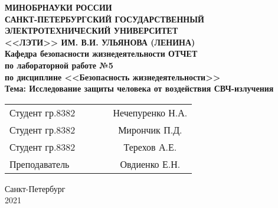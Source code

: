 \begin{titlepage}

\begin{center}
\textbf{
МИНОБРНАУКИ РОССИИ \\
САНКТ-ПЕТЕРБУРГСКИЙ ГОСУДАРСТВЕННЫЙ \\
ЭЛЕКТРОТЕХНИЧЕСКИЙ УНИВЕРСИТЕТ \\
<<ЛЭТИ>> ИМ. В.И. УЛЬЯНОВА (ЛЕНИНА) \\
Кафедра безопасности жизнедеятельности
\vfill
ОТЧЕТ\\
по лабораторной работе №5\\
по дисциплине <<Безопасность жизнедеятельности>>\\
Тема: Исследование защиты человека от воздействия СВЧ-излучения
\vfill
}
\begin{tabular}{ l c c c c }
 Студент гр.8382 & \hspace{2cm} & \underline{\hspace{4cm}} & \hspace{1cm} & Нечепуренко Н.А. \\
 Студент гр.8382 & \hspace{2cm} & \underline{\hspace{4cm}} & \hspace{1cm} & Мирончик П.Д. \\
 Студент гр.8382 & \hspace{2cm} & \underline{\hspace{4cm}} & \hspace{1cm} & Терехов А.Е. \\
 Преподаватель & \hspace{2cm} & \underline{\hspace{4cm}} & \hspace{1cm} & Овдиенко Е.Н.
\end{tabular}

\vspace{3cm}

Санкт-Петербург\\
2021
\end{center}

\end{titlepage}
